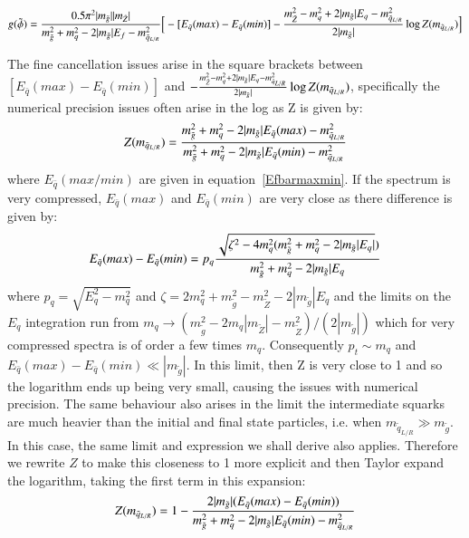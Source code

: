\documentclass[final,3p,times]{elsarticle}
\begin{document}
\begin{equation}
g(\tilde{\phi}) = {0.5 \pi^2 |m_{\tilde{g}}||m_{\tilde{Z}}| \over m_{\tilde{g}}^2 + m_{q}^2 - 2|m_{\tilde{g}}|E_f-m_{\tilde{q}_{L/R}}^2} \Big[-[E_{\bar{q}}(max) - E_{\bar{q}}(min)]-{m_{\tilde{Z}}^2 - m_{q}^2 + 2|m_{\tilde{g}}|E_q - m_{\tilde{q}_{L/R}}^2 \over 2|m_{\tilde{g}}|} \log Z(m_{\tilde{q}_{L/R}})\Big] 
\end{equation}

The fine cancellation issues arise in the square brackets between $[E_{\bar{q}}(max) - E_{\bar{q}}(min)]$ and $-{m_{\tilde{Z}}^2 - m_{q}^2 + 2|m_{\tilde{g}}|E_q - m_{\tilde{q}_{L/R}}^2 \over 2|m_{\tilde{g}}|} \log Z(m_{\tilde{q}_{L/R}})$, specifically the numerical precision issues often arise in the log as Z is given by:
\begin{equation}
Z(m_{\tilde{q}_{L/R}}) = {m_{\tilde{g}}^2 + m_{q}^2 - 2|m_{\tilde{g}}|E_{\bar{q}}(max) - m_{\tilde{q}_{L/R}}^2 \over m_{\tilde{g}}^2 + m_{q}^2 - 2|m_{\tilde{g}}|E_{\bar{q}}(min) - m_{\tilde{q}_{L/R}}^2}
\end{equation}
where $E_{\bar{q}}(max/min)$ are given in equation~\ref{Efbarmaxmin}. If the spectrum is very compressed, $E_{\bar{q}}(max)$ and $E_{\bar{q}}(min)$ are very close as there difference is given by:
\begin{equation}
E_{\bar{q}}(max) - E_{\bar{q}}(min) = p_q{\sqrt{\zeta^2 - 4m_q^2(m_{\tilde{g}}^2+m_q^2-2|m_{\tilde{g}}|E_q|}) \over m_{\tilde{g}}^2 + m_q^2 - 2|m_{\tilde{g}}|E_q}
\end{equation}
where $p_q = \sqrt{E_q^2 - m_q^2}$ and $\zeta = 2m_q^2 +
m_{\tilde{g}}^2-m_{\tilde{Z}}^2-2|m_{\tilde{g}}|E_q$ and the limits on the
$E_q$ integration run from $m_q \rightarrow
(m_{\tilde{g}}^2-2m_q|m_{\tilde{Z}}|-m_{\tilde{Z}}^2)/(2|m_{\tilde{g}}|)$
which for very compressed spectra is of order a few times $m_q$. Consequently
$p_t \sim m_q$ and $E_{\bar{q}}(max) - E_{\bar{q}}(min) \ll
|m_{\tilde{g}}|$. In this limit, then Z is very close to 1 and so the
logarithm ends up being very small, causing the issues with numerical
precision. The same behaviour also arises in the limit the intermediate squarks
are much heavier than the initial and final state particles,
i.e. when $m_{\tilde{q}_{L/R}}\gg m_{\tilde{g}}$. In this case, the same limit
and expression we shall derive also applies. Therefore we rewrite $Z$ to make
this closeness to 1 more explicit and then Taylor expand the logarithm, taking
the first term in this expansion: 
\begin{equation}
Z(m_{\tilde{q}_{L/R}}) = 1 - {2|m_{\tilde{g}}|(E_{\bar{q}}(max) - E_{\bar{q}}(min)) \over m_{\tilde{g}}^2 + m_{q}^2 - 2|m_{\tilde{g}}|E_{\bar{q}}(min) - m_{\tilde{q}_{L/R}}^2}
\end{equation}
\end{document}
